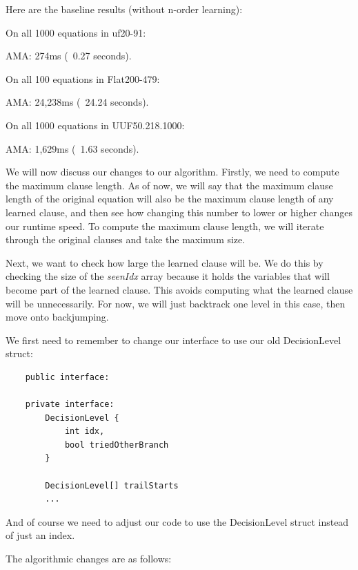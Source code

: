 Here are the baseline results (without n-order learning):
\begin{FVerbatim}
On all 1000 equations in uf20-91:

AMA:     274ms (~0.27 seconds).

On all 100 equations in Flat200-479:

AMA:     24,238ms (~24.24 seconds).

On all 1000 equations in UUF50.218.1000:

AMA:     1,629ms (~1.63 seconds).
\end{FVerbatim}
\noindent
We will now discuss our changes to our algorithm. Firstly, we need to compute the 
maximum clause length. As of now, we will say that the maximum clause length of the 
original equation will also be the maximum clause length of any learned clause, and then 
see how changing this number to lower or higher changes our runtime speed. To compute 
the maximum clause length, we will iterate through the original clauses and take the 
maximum size.

Next, we want to check how large the learned clause will be. We do this by checking 
the size of the \textit{seenIdx} array because it holds the variables that will 
become part of the learned clause. This avoids computing what the learned clause will 
be unnecessarily. For now, we will just backtrack one level in this case, then move onto 
backjumping.

We first need to remember to change our interface to use our old DecisionLevel struct:
\begin{lstlisting}
    public interface:

    private interface:
        DecisionLevel {
            int idx,
            bool triedOtherBranch
        }

        DecisionLevel[] trailStarts
        ...
\end{lstlisting}
\noindent
And of course we need to adjust our code to use the DecisionLevel struct instead of just an index.

The algorithmic changes are as follows:

